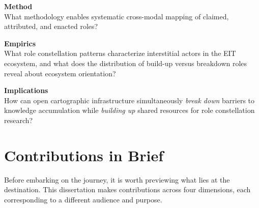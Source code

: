 \documentclass[../main.tex]{subfiles}
\begin{document}
\begin{subrq}
\textbf{Method}\\
What methodology enables systematic cross-modal mapping of claimed, attributed, and enacted roles?
\end{subrq}

\begin{subrq}
\textbf{Empirics}\\
What role constellation patterns characterize interstitial actors in the EIT ecosystem, and what does the distribution of build-up versus breakdown roles reveal about ecosystem orientation?
\end{subrq}

\begin{subrq}
\textbf{Implications}\\
How can open cartographic infrastructure simultaneously \emph{break down} barriers to knowledge accumulation while \emph{building up} shared resources for role constellation research?
\end{subrq}


\section{Contributions in Brief}
\label{sec:intro:contributions}

Before embarking on the journey, it is worth previewing what lies at the destination. This dissertation makes contributions across four dimensions, each corresponding to a different audience and purpose.
\end{document}
